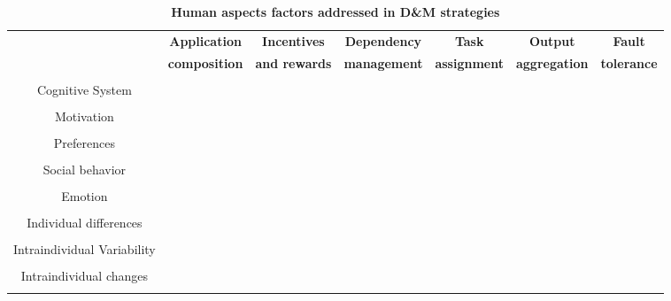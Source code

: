 \documentclass[11pt]{bmc_article_s50}
\begin{document}
\begin{sidewaystable}
\caption{\bf Human aspects factors addressed in D\&M strategies}\label{tab1}
\begin{tabular}{@{\extracolsep\fill}ccccccc@{\extracolsep\fill}}
\hline
& {\textbf{Application}} & {\textbf{Incentives}} & {\textbf{Dependency}}& {\textbf{Task}}&{\textbf{Output}}&{\textbf{Fault}}\\
{} & {\textbf{composition}} &{\textbf{and rewards}} & {\textbf{management}}& {\textbf{assignment}}&{\textbf{aggregation}}&{\textbf{tolerance}}\\\hline\\[-10pt]

{Cognitive System} &\cite{Venetis:2012,Kulkarni2012,Khanna:2010,Sun:Hcomp:2011}&&&\cite{Heidari:2013}& \cite{whitehill:ANIPS:2009,Salek:2013}&\cite{Ipeirotis:HCOMP2010}\\[2pt]\hline\\[-10pt]

{Motivation} &&\cite{Archak:2010,Barowy:2012,Mason:2009,Huang:2013,Witkowski:2013, Chandler:HCOMP:2011,Singla:www:2013,Singer:www:2013,Rao:2013}& &\cite{Barowy:2012}&& \cite{Mason:2009,Rogstadius:ICWSM:2011,Kinnaird:2013} \\[2pt]\hline\\[-10pt]


{Preferences} &\cite{Bernstein:2010} && &\cite{Toomim:CHI:2011,Chilton:HCOMP:2010,Ambati:HCOMP:2012,Lee:2013, Jason:2013}&&\\[2pt]\hline\\[-10pt]


{Social behavior} && \cite{Shaw:CSCW:2011,Huang:CHI:2013}& \cite{Kearns:2012,Zhang:2012,Mao:2011,Irani:2013} &\cite{Difallah:www:2013} &&\cite{Barowy:2012}\\[2pt]\hline\\[-10pt]

{Emotion} & &&& \cite{Picard:2003,Morris:2011}&& \cite{Ipeirotis:HCOMP2010}\\[2pt]\hline\\[-10pt]

{Individual differences} &\cite{Bernstein:2010,Kulkarni2012,Christopher:2012} && &\cite{Noronha:2011,Schallwwwj:2012,Archak:2010,Waterhouse:2013} &\cite{Sheng:KDD:2008,whitehill:ANIPS:2009,Hovy:NAACL-HLT:2013,Kulkarni2012, Bernstein:2010,Sun:Hcomp:2011,Dalvi:2013}& \cite{Kulkarni2012,Bernstein:2010,Rzeszotarski:UIST:2012,Kulkarni2011b, Hansen:2013}\\[2pt]\hline\\[-10pt]

{Intraindividual Variability} & && & && \cite{Ipeirotis:HCOMP2010,Dow:CSCW:2012,Rzeszotarski:UIST:2012}\\[2pt]\hline\\[-10pt]

{Intraindividual changes} &&&&\cite{Satzger:2011} &&\cite{Dow:CSCW:2012,Vuurens-CIR2011}\\[2pt]\hline\\[-10pt]
\end{tabular}
\end{sidewaystable} \clearpage 
\end{document}

